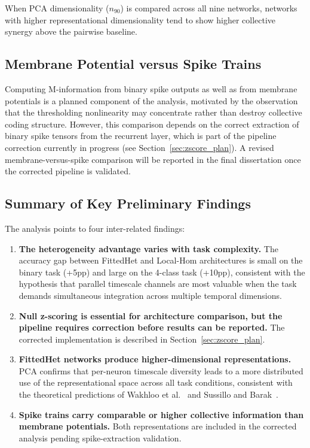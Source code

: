 \documentclass[12pt,twoside]{report}
\begin{document}
When PCA dimensionality ($n_{90}$) is compared across all nine networks,
networks with higher representational dimensionality tend to show higher
collective synergy above the pairwise baseline.

\subsection{Membrane Potential versus Spike Trains}

Computing M-information from binary spike outputs as well as from membrane 
potentials is a planned component of the analysis, motivated by the observation 
that the thresholding nonlinearity may concentrate rather than destroy collective 
coding structure. However, this comparison depends on the correct extraction of 
binary spike tensors from the recurrent layer, which is part of the pipeline 
correction currently in progress (see Section~\ref{sec:zscore_plan}). 
A revised membrane-versus-spike comparison will be reported in the final 
dissertation once the corrected pipeline is validated.

\subsection{Summary of Key Preliminary Findings}

The analysis points to four inter-related findings:

\begin{enumerate}

    \item \textbf{The heterogeneity advantage varies with task complexity.} 
    The accuracy gap between FittedHet and Local-Hom architectures is small 
    on the binary task (+5pp) and large on the 4-class task (+10pp), 
    consistent with the hypothesis that parallel timescale channels are most 
    valuable when the task demands simultaneous integration across multiple 
    temporal dimensions.

    \item \textbf{Null z-scoring is essential for architecture comparison, but the pipeline requires correction before results can be reported.}
    The corrected implementation is described in Section~\ref{sec:zscore_plan}.

    \item \textbf{FittedHet networks produce higher-dimensional 
    representations.} PCA confirms that per-neuron timescale diversity leads 
    to a more distributed use of the representational space across all task 
    conditions, consistent with the theoretical predictions of 
    Wakhloo et al.~\cite{wakhloo2026} and Sussillo and Barak~\cite{sussillo2013}.

    \item \textbf{Spike trains carry comparable or higher collective
    information than membrane potentials.} Both representations are included
    in the corrected analysis pending spike-extraction validation.

\end{enumerate}
\end{document}
